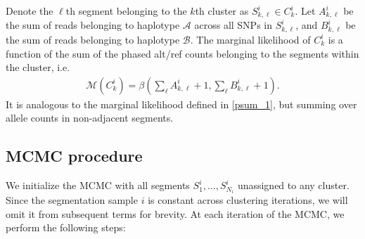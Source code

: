 \documentclass[10pt,letter]{article}
\numberwithin{equation}{section}
\begin{document}
Denote the $\ell$th segment belonging to the $k$th cluster as $S^i_{k,\ell}\in C^i_k$. Let $A^i_{k,\ell}$ be the sum of reads belonging to haplotype $\mathcal A$ across all SNPs in $S^i_{k,\ell}$, and $B^i_{k,\ell}$ be the sum of reads belonging to haplotype $\mathcal B$. 
The marginal likelihood of $C^i_k$ is a function of the sum of the phased alt/ref counts belonging to the segments within the cluster, i.e.
\begin{align*}
\mathcal{M}(C^i_k) = \beta(\textstyle\sum_\ell A^i_{k,\ell} + 1, \textstyle\sum_\ell  B^i_{k,\ell} + 1).
\end{align*}
It is analogous to the marginal likelihood defined in \eqref{psum_1}, but summing over allele counts in non-adjacent segments.

\subsection{MCMC procedure}
\label{DP_section}

We initialize the MCMC with all segments $S^i_1,\dots,S^i_{N_i}$ unassigned to any cluster. Since the segmentation sample $i$ is constant across clustering iterations, we will omit it from subsequent terms for brevity. At each iteration of the MCMC, we perform the following steps:
\end{document}
